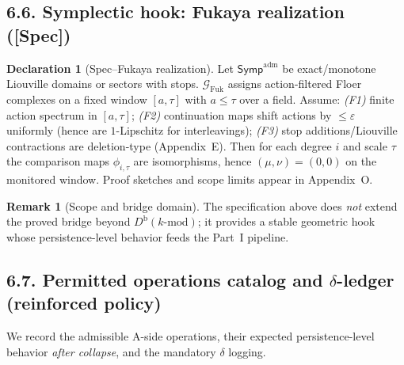 \documentclass[11pt]{article}
\numberwithin{equation}{section}
\theoremstyle{plain}
\theoremstyle{definition}
\theoremstyle{remark}
\DeclareRobustCommand{\hyp}{\nobreakdash-}
\theoremstyle{plain}
\theoremstyle{definition}
\numberwithin{equation}{section}
\theoremstyle{definition}
\newtheorem{remark}[theorem]{Remark}
\newtheorem{declaration}[theorem]{Declaration}
\numberwithin{equation}{section}
\theoremstyle{plain}
\theoremstyle{definition}
\theoremstyle{remark}
\begin{document}
\subsection*{6.6. Symplectic hook: Fukaya realization (\textbf{[Spec]})}
\begin{declaration}[Spec--Fukaya realization]\label{spec:fukaya}
Let \(\mathsf{Symp}^{\mathrm{adm}}\) be exact/monotone Liouville domains or sectors with stops.
\(\mathcal{G}_{\mathrm{Fuk}}\) assigns action\hyp filtered Floer complexes on a fixed window \([a,\tau]\) with \(a\le \tau\) over a field.
Assume:
\emph{(F1)} finite action spectrum in \([a,\tau]\);
\emph{(F2)} continuation maps shift actions by \(\le\varepsilon\) uniformly (hence are \(1\)\hyp Lipschitz for interleavings);
\emph{(F3)} stop additions/Liouville contractions are deletion\hyp type (Appendix~E).
Then for each degree \(i\) and scale \(\tau\) the comparison maps \(\phi_{i,\tau}\) are isomorphisms, hence \((\mu,\nu)=(0,0)\) on the monitored window.
Proof sketches and scope limits appear in Appendix~O.
\end{declaration}

\begin{remark}[Scope and bridge domain]
The specification above does \emph{not} extend the proved bridge beyond \(D^{\mathrm{b}}(k\text{-mod})\);
it provides a stable geometric hook whose persistence\hyp level behavior feeds the Part~I pipeline.
\end{remark}

\subsection*{6.7. Permitted operations catalog and $\delta$-ledger (reinforced policy)}\label{subsec:ops-delta}
We record the admissible A\hyp side operations, their expected persistence\hyp level behavior \emph{after collapse}, and the mandatory $\delta$ logging.
\end{document}
